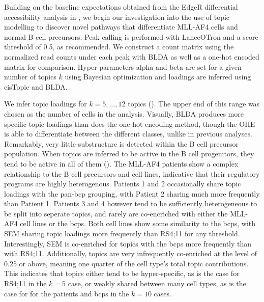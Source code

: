 Building on the baseline expectations obtained from the EdgeR differential accessibility analysis in , we begin our investigation into the use of topic modelling to discover novel pathways that differentiate MLL-AF4 cells and normal B cell precursors. Peak calling is performed with LanceOTron and a score threshold of 0.5, as recommended. We construct a count matrix using the normalized read counts under each peak with BLDA as well as a one-hot encoded matrix for comparison.  Hyper-parameters alpha and beta are set for a given number of topics $k$ using Bayesian optimization and loadings are inferred using cisTopic and BLDA. 

We infer topic loadings for $k=5,\ldots,12$ topics (). The upper end of this range was chosen as the number of cells in the analysis. Visually, BLDA produces more specific topic loadings than does the one-hot encoding method, though the OHE is able to differentiate between the different classes, unlike in previous analyses.  Remarkably, very little substructure is detected within the B cell precursor population. When topics are inferred to be active in the B cell progenitors, they tend to be active in all of them (). The MLL-AF4 patients show a complex relationship to the B cell precursors and cell lines, indicative that their regulatory programs are highly heterogenous. Patients 1 and 2 occasionally share topic loadings with the pan-\gls{bcp} grouping, with Patient 2 sharing much more frequently than Patient 1. Patients 3 and 4 however tend to be sufficiently heterogeneous to be split into seperate topics, and rarely are co-encriched with either the MLL-AF4 cell lines or the \glspl{bcp}. Both cell lines show some similarity to the \glspl{bcp}, with SEM sharing topic loadings more frequently than RS4;11 for any threshold. Interestingly, SEM is co-enriched for topics with the \glspl{bcp} more frequently than with RS4;11. Additionally, topics are very infrequently co-enriched at the level of 0.25 or above, meaning one quarter of the cell type's total topic contributions. This indicates that topics either tend to be hyper-specific, as is the case for RS4;11 in the $k=5$ case, or weakly shared between many cell types, as is the case for for the patients and \glspl{bcp} in the $k=10$ cases.

